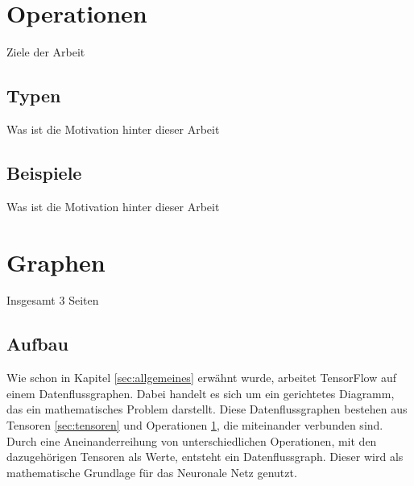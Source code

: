 \section{Operationen}
\label{sec:operationen}
\printsubchapterauthor{\authorMarco}
Ziele der Arbeit

\subsection{Typen}
\label{sec:typen}
Was ist die Motivation hinter dieser Arbeit

\subsection{Beispiele}
\label{sec:beispiele}
Was ist die Motivation hinter dieser Arbeit

\section{Graphen}
\label{sec:graphen}
\printsubchapterauthor{\authorNiklas}
Insgesamt 3 Seiten

\subsection{Aufbau}
\label{sec:graphenAufbau}

Wie schon in Kapitel \ref{sec:allgemeines} erwähnt wurde, arbeitet TensorFlow auf einem Datenflussgraphen. Dabei handelt es sich um ein gerichtetes Diagramm, das ein mathematisches Problem darstellt. Diese Datenflussgraphen bestehen aus Tensoren \ref{sec:tensoren} und Operationen \ref{sec:operationen}, die miteinander verbunden sind. Durch eine Aneinanderreihung von unterschiedlichen Operationen, mit den dazugehörigen Tensoren als Werte, entsteht ein Datenflussgraph. Dieser wird als mathematische Grundlage für das Neuronale Netz genutzt.

